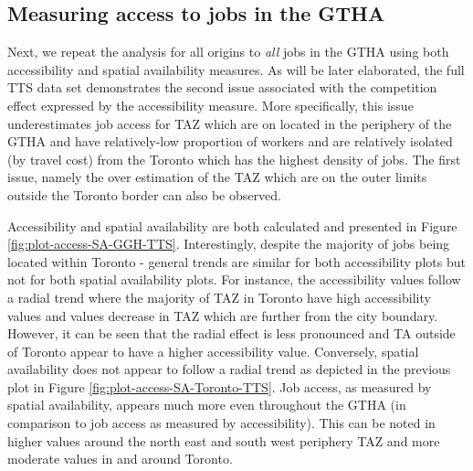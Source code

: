 \documentclass[]{elsarticle} %
\begin{document}
\newpage

\hypertarget{measuring-access-to-jobs-in-the-gtha}{%
\subsection{Measuring access to jobs in the
GTHA}\label{measuring-access-to-jobs-in-the-gtha}}

Next, we repeat the analysis for all origins to \emph{all} jobs in the
GTHA using both accessibility and spatial availability measures. As will
be later elaborated, the full TTS data set demonstrates the second issue
associated with the competition effect expressed by the accessibility
measure. More specifically, this issue underestimates job access for TAZ
which are on located in the periphery of the GTHA and have
relatively-low proportion of workers and are relatively isolated (by
travel cost) from the Toronto which has the highest density of jobs. The
first issue, namely the over estimation of the TAZ which are on the
outer limits outside the Toronto border can also be observed.

Accessibility and spatial availability are both calculated and presented
in Figure \ref{fig:plot-access-SA-GGH-TTS}. Interestingly, despite the
majority of jobs being located within Toronto - general trends are
similar for both accessibility plots but not for both spatial
availability plots. For instance, the accessibility values follow a
radial trend where the majority of TAZ in Toronto have high
accessibility values and values decrease in TAZ which are further from
the city boundary. However, it can be seen that the radial effect is
less pronounced and TA outside of Toronto appear to have a higher
accessibility value. Conversely, spatial availability does not appear to
follow a radial trend as depicted in the previous plot in Figure
\ref{fig:plot-access-SA-Toronto-TTS}. Job access, as measured by spatial
availability, appears much more even throughout the GTHA (in comparison
to job access as measured by accessibility). This can be noted in higher
values around the north east and south west periphery TAZ and more
moderate values in and around Toronto.
\end{document}
